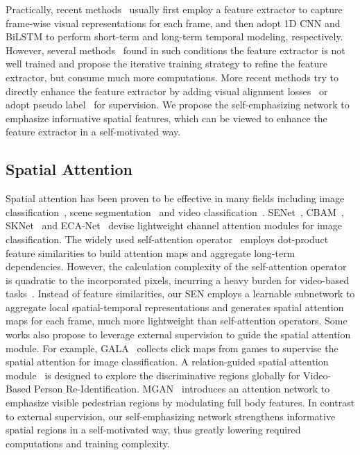 \documentclass[letterpaper]{article} \usepackage{aaai23}  \usepackage{times}  \usepackage{helvet}  \usepackage{courier}  \usepackage[hyphens]{url}  \usepackage{graphicx} \urlstyle{rm} \def\UrlFont{\rm}  \usepackage{natbib}  \usepackage{caption} \frenchspacing  \setlength{\pdfpagewidth}{8.5in} \setlength{\pdfpageheight}{11in} \usepackage{algorithm}
\begin{document}
Practically, recent methods~\cite{pu2019iterative,pu2020boosting,cheng2020fully,cui2019deep,niu2020stochastic,Min_2021_ICCV} usually first employ a feature extractor to capture frame-wise visual representations for each frame, and then adopt 1D CNN and BiLSTM to perform short-term and long-term temporal modeling, respectively. However, several methods~\cite{pu2019iterative,cui2019deep} found in such conditions the feature extractor is not well trained and propose the iterative training strategy to refine the feature extractor, but consume much more computations. More recent methods try to directly enhance the feature extractor by adding visual alignment losses~\cite{Min_2021_ICCV} or adopt pseudo label~\cite{cheng2020fully,hao2021self} for supervision. We propose the self-emphasizing network to emphasize informative spatial features, which can be viewed to enhance the feature extractor in a self-motivated way.


\subsection{Spatial Attention }
Spatial attention has been proven to be effective in many fields including image classification~\cite{cao2019gcnet,hu2018gather,woo2018cbam,hu2018squeeze}, scene segmentation~\cite{fu2019dual} and video classification~\cite{wang2018non}. SENet~\cite{hu2018squeeze}, CBAM~\cite{woo2018cbam}, SKNet~\cite{li2019selective} and ECA-Net~\cite{wang2020eca} devise lightweight channel attention modules for image classification. The widely used self-attention operator~\cite{wang2018non} employs dot-product feature similarities to build attention maps and aggregate long-term dependencies. However, the calculation complexity of the self-attention operator is quadratic to the incorporated pixels, incurring a heavy burden for video-based tasks~\cite{wang2018non}. Instead of feature similarities, our SEN employs a learnable subnetwork to aggregate local spatial-temporal representations and generates spatial attention maps for each frame, much more lightweight than self-attention operators. Some works also propose to leverage external supervision to guide the spatial attention module. For example, GALA~\cite{linsley2018learning} collects click maps from games to supervise the spatial attention for image classification. A relation-guided spatial attention module~\cite{li2020relation} is designed to explore the discriminative regions globally for Video-Based Person Re-Identification. MGAN~\cite{pang2019mask} introduces an attention network to emphasize visible pedestrian regions by modulating full body features. In contrast to external supervision, our self-emphasizing network strengthens informative spatial regions in a self-motivated way, thus greatly lowering required computations and training complexity.
\end{document}
